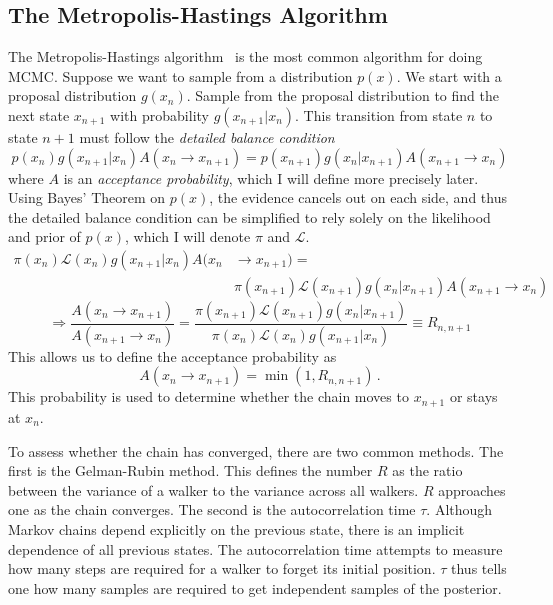 \subsection{The Metropolis-Hastings Algorithm}
The Metropolis-Hastings algorithm~\cite{tobias_metropolis-hastings_nodate,zhao_bayesian_2021,helsby_monte_nodate} is the most common algorithm for doing MCMC. Suppose we want to sample from a distribution $p(x)$. We start with a proposal distribution $g(x_n)$. 
Sample from the proposal distribution to find the next state $x_{n+1}$ with probability $g(x_{n+1}|x_n)$. 
This transition from state $n$ to state $n+1$ must follow the \textit{detailed balance condition}
\begin{equation}
	p(x_n) g(x_{n+1}|x_n) A(x_n \rightarrow x_{n+1}) = p(x_{n+1}) g(x_n|x_{n+1}) A(x_{n+1} \rightarrow x_{n})
\end{equation}
where $A$ is an \textit{acceptance probability}, which I will define more precisely later. 
Using Bayes' Theorem on $p(x)$, the evidence cancels out on each side, 
and thus the detailed balance condition can be simplified to rely solely on the likelihood and prior of $p(x)$, 
which I will denote $\pi$ and $\mathcal{L}$.
\begin{equation}
	\begin{split}
		\pi(x_n)\mathcal{L}(x_n) g(x_{n+1}|x_n) A(x_n &\rightarrow x_{n+1}) = \\
		&\pi(x_{n+1}) \mathcal{L}(x_{n+1}) g(x_{n}|x_{n+1}) A(x_{n+1}\rightarrow x_{n})
	\end{split}
\end{equation}
\begin{equation}
	\Rightarrow \frac{A(x_n \rightarrow x_{n+1})}{A(x_{n+1}\rightarrow x_{n})} = \frac{\pi(x_{n+1}) \mathcal{L}(x_{n+1}) g(x_{n}|x_{n+1})}{\pi(x_n)\mathcal{L}(x_n) g(x_{n+1}|x_n)} \equiv R_{n,n+1}
\end{equation}
This allows us to define the acceptance probability as
\begin{equation}
	A(x_n \rightarrow x_{n+1}) = \min( 1, R_{n,n+1} )\,.
\end{equation}
This probability is used to determine whether the chain moves to $x_{n+1}$ or stays at $x_n$.

To assess whether the chain has converged, there are two common methods. The first is the Gelman-Rubin method. This defines the number $R$ as the ratio between the variance of a walker to the variance across all walkers. $R$ approaches one as the chain converges. The second is the autocorrelation time $\tau$. Although Markov chains depend explicitly on the previous state, there is an implicit dependence of all previous states. The autocorrelation time attempts to measure how many steps are required for a walker to forget its initial position. $\tau$ thus tells one how many samples are required to get independent samples of the posterior.

